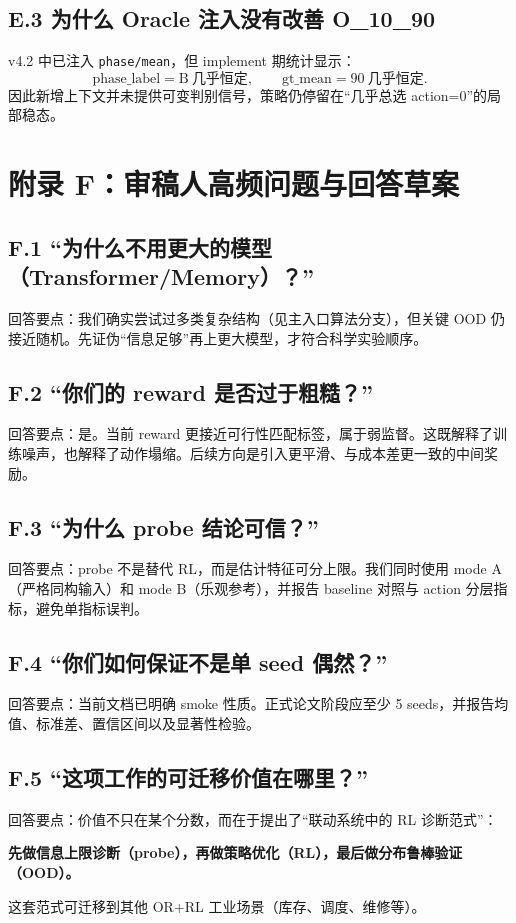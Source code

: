 ﻿\documentclass[11pt,a4paper]{ctexart}
\begin{document}
\subsection*{E.3 为什么 Oracle 注入没有改善 O\_10\_90}
v4.2 中已注入 \texttt{phase/mean}，但 implement 期统计显示：
\begin{equation}
\text{phase\_label}=\text{B}\ \text{几乎恒定},\qquad
\text{gt\_mean}=90\ \text{几乎恒定}.
\end{equation}
因此新增上下文并未提供可变判别信号，策略仍停留在“几乎总选 action=0”的局部稳态。

\section*{附录 F：审稿人高频问题与回答草案}
\subsection*{F.1 ``为什么不用更大的模型（Transformer/Memory）？''}
回答要点：我们确实尝试过多类复杂结构（见主入口算法分支），但关键 OOD 仍接近随机。先证伪“信息足够”再上更大模型，才符合科学实验顺序。

\subsection*{F.2 ``你们的 reward 是否过于粗糙？''}
回答要点：是。当前 reward 更接近可行性匹配标签，属于弱监督。这既解释了训练噪声，也解释了动作塌缩。后续方向是引入更平滑、与成本差更一致的中间奖励。

\subsection*{F.3 ``为什么 probe 结论可信？''}
回答要点：probe 不是替代 RL，而是估计特征可分上限。我们同时使用 mode A（严格同构输入）和 mode B（乐观参考），并报告 baseline 对照与 action 分层指标，避免单指标误判。

\subsection*{F.4 ``你们如何保证不是单 seed 偶然？''}
回答要点：当前文档已明确 smoke 性质。正式论文阶段应至少 5 seeds，并报告均值、标准差、置信区间以及显著性检验。

\subsection*{F.5 ``这项工作的可迁移价值在哪里？''}
回答要点：价值不只在某个分数，而在于提出了“联动系统中的 RL 诊断范式”：
\begin{center}
\textbf{先做信息上限诊断（probe），再做策略优化（RL），最后做分布鲁棒验证（OOD）。}
\end{center}
这套范式可迁移到其他 OR+RL 工业场景（库存、调度、维修等）。
\end{document}
